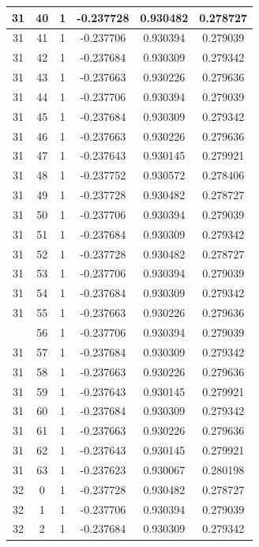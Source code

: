 \documentclass[12pt,a4paper]{article}
\numberwithin{equation}{section}
\numberwithin{figure}{section}
\numberwithin{table}{section}
\begin{document}
\begin{longtable}{|c|c|c|c|c|c|}
31 & 40 & 1 & -0.237728 & 0.930482 & 0.278727 \\ \hline
31 & 41 & 1 & -0.237706 & 0.930394 & 0.279039 \\ \hline
31 & 42 & 1 & -0.237684 & 0.930309 & 0.279342 \\ \hline
31 & 43 & 1 & -0.237663 & 0.930226 & 0.279636 \\ \hline
31 & 44 & 1 & -0.237706 & 0.930394 & 0.279039 \\ \hline
31 & 45 & 1 & -0.237684 & 0.930309 & 0.279342 \\ \hline
31 & 46 & 1 & -0.237663 & 0.930226 & 0.279636 \\ \hline
31 & 47 & 1 & -0.237643 & 0.930145 & 0.279921 \\ \hline
31 & 48 & 1 & -0.237752 & 0.930572 & 0.278406 \\ \hline
31 & 49 & 1 & -0.237728 & 0.930482 & 0.278727 \\ \hline
31 & 50 & 1 & -0.237706 & 0.930394 & 0.279039 \\ \hline
31 & 51 & 1 & -0.237684 & 0.930309 & 0.279342 \\ \hline
31 & 52 & 1 & -0.237728 & 0.930482 & 0.278727 \\ \hline
31 & 53 & 1 & -0.237706 & 0.930394 & 0.279039 \\ \hline
31 & 54 & 1 & -0.237684 & 0.930309 & 0.279342 \\ \hline
31 & 55 & 1 & -0.237663 & 0.930226 & 0.279636 \\ \hline
\pagebreak
31 & 56 & 1 & -0.237706 & 0.930394 & 0.279039 \\ \hline
31 & 57 & 1 & -0.237684 & 0.930309 & 0.279342 \\ \hline
31 & 58 & 1 & -0.237663 & 0.930226 & 0.279636 \\ \hline
31 & 59 & 1 & -0.237643 & 0.930145 & 0.279921 \\ \hline
31 & 60 & 1 & -0.237684 & 0.930309 & 0.279342 \\ \hline
31 & 61 & 1 & -0.237663 & 0.930226 & 0.279636 \\ \hline
31 & 62 & 1 & -0.237643 & 0.930145 & 0.279921 \\ \hline
31 & 63 & 1 & -0.237623 & 0.930067 & 0.280198 \\ \hline
32 & 0 & 1 & -0.237728 & 0.930482 & 0.278727 \\ \hline
32 & 1 & 1 & -0.237706 & 0.930394 & 0.279039 \\ \hline
32 & 2 & 1 & -0.237684 & 0.930309 & 0.279342 \\ \hline

\end{longtable}
\end{document}
